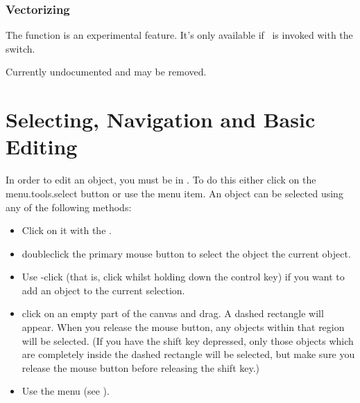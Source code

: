 
\subsection{Vectorizing}\label{sec:vectorize}

The  function is an experimental
feature. It's only available if \FlowframTk\ is invoked with
the  switch.

Currently undocumented and may be removed.


\chapter{Selecting, Navigation and Basic Editing}\label{sec:selectobjects}


In order to edit an \gls{object}, you must be in \selectmode. To do
this either click on the \gls{menu.tools.select} button or use the 
 menu item. An \gls*{object} can
be selected using any of the following methods:
\begin{itemize}
\item Click on it with the .

\item \Gls{doubleclick} the primary mouse button to
select the \gls*{object}  the current \gls*{object}.

\item Use -click (that is, \gls{click} whilst holding down the control
 key) if you want to add an \gls*{object} to the current
selection.

\item \Gls{click} on an empty part of the \gls{canvas} and
drag. A dashed rectangle will appear. When you release the mouse
button, any \glspl*{object} within that
region will be selected. (If you have the shift  key depressed,
only those objects which are completely inside the dashed
rectangle will be selected, but make sure you release the mouse
button before releasing the shift key.)

\item Use the  menu (see ).

\end{itemize}


